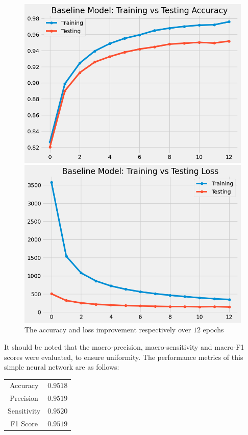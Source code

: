\documentclass[a4paper,twoside,10pt]{article}
\begin{document}
\begin{figure}[H]
    \begin{minipage}{0.5\linewidth}
        \centering
        \includegraphics[scale=0.3]{Baseline Acc}
    \end{minipage}\hfill
    \begin{minipage}{0.5\linewidth}
        \centering
        \includegraphics[scale=0.3]{Baseline Loss}
    \end{minipage}\hfill
    \caption{The accuracy and loss improvement respectively over $12$ epochs}
    \label{fig:baseline_graph_perf}
\end{figure}

It should be noted that the macro-precision, macro-sensitivity and macro-F1 scores were evaluated, to ensure uniformity.
The performance metrics of this simple neural network are as follows:
\begin{center}
\begin{tabular}{||c|c||}
    Accuracy & $0.9518$ \\
    Precision & $0.9519$ \\
    Sensitivity & $0.9520$ \\
    F1 Score & $0.9519$ \\
\end{tabular}
\end{center}
\end{document}

